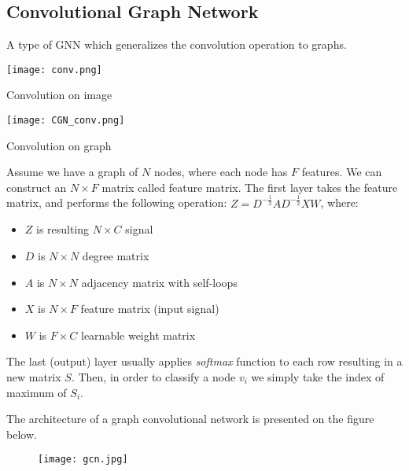 \subsection{Convolutional Graph Network}
\begin{frame}[allowframebreaks]{\subsecname}
	A type of GNN which generalizes the convolution operation to graphs.

	\begin{multicols}{2}
		\centering
		\texttt{[image: conv.png]}
		\caption{Convolution on image}
		\hfill
		\centering
		\texttt{[image: CGN\_conv.png]}
		\caption{Convolution on graph}
	\end{multicols}

	\framebreak

	Assume we have a graph of $N$ nodes, where each node has $F$ features.
	We can construct an $N \times F$ matrix called feature matrix.
	The first layer takes the feature matrix, and performs the following operation: $Z = D^{-\frac{1}{2}} A D^{-\frac{1}{2}} X W$, where:
	\begin{itemize}
		\item $Z$ is resulting $N \times C$ signal
		\item $D$ is $N \times N$ degree matrix
		\item $A$ is $N \times N$ adjacency matrix with self-loops
		\item $X$ is $N \times F$ feature matrix (input signal)
		\item $W$ is $F \times C$ learnable weight matrix
	\end{itemize}

	The last (output) layer usually applies \emph{softmax} function to each row resulting in a new matrix $S$.
	Then, in order to classify a node $v_i$ we simply take the index of maximum of $S_i$.

	\framebreak

	The architecture of a graph convolutional network is presented on the figure below.
	\begin{figure}[h]
		\centering
		\texttt{[image: gcn.jpg]}
	\end{figure}
\end{frame}

